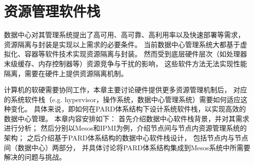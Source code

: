 

\chapter{资源管理软件栈}
\label{chap:prm}


数据中心对其管理系统提出了高可用、高可靠、高利用率以及快速部署等需求，
资源隔离与封装是实现以上需求的必要条件。
当前数据中心管理系统大都基于虚拟化、容器等软件技术实现资源隔离与封装。
然而受到底层硬件层次（如处理器末级缓存、内存控制器等）资源竞争与干扰的影响，
这些软件方法无法实现性能隔离，需要在硬件上提供资源隔离机制。


计算机的软硬需要协同工作，本章主要讨论硬件提供更多资源管理机制后，
对应的系统软件栈（e.g. hypervisor，操作系统，数据中心管理系统）需要如何适应这种变化。
具体来说，即如何在PARD体系结构下设计系统软件栈，以实现高效的数据中心管理。
本章内容安排如下：
首先介绍数据中心软件栈背景，并对其需求进行分析；
然后分别以Mesos和IPMI为例，介绍节点间与节点内资源管理系统的架构；
之后介绍基于PARD体系结构的数据中心软件栈设计，
包括节点内与节点间（数据中心）两部分，
并具体讨论将PARD体系结构集成到Mesos系统中所需要解决的问题与挑战。

